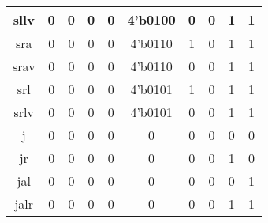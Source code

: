 \documentclass[UTF8]{ctexart}
\begin{document}
\begin{table}[H]
\begin{threeparttable}
\begin{tabular}{|c|c|c|c|c|c|c|c|c|c|}
			\hline
			sllv                                     & 0                 & 0                 & 0               & 0                 & 4'b0100          & 0                & 0               & 1               & 1                 \\
			\hline
			sra                                      & 0                 & 0                 & 0               & 0                 & 4'b0110          & 1                & 0               & 1               & 1                 \\
			\hline
			srav                                     & 0                 & 0                 & 0               & 0                 & 4'b0110          & 0                & 0               & 1               & 1                 \\
			\hline
			srl                                      & 0                 & 0                 & 0               & 0                 & 4'b0101          & 1                & 0               & 1               & 1                 \\
			\hline
			srlv                                     & 0                 & 0                 & 0               & 0                 & 4'b0101          & 0                & 0               & 1               & 1                 \\
			\hline
			j                                        & 0                 & 0                 & 0               & 0                 & 0                & 0                & 0               & 0               & 0                 \\
			\hline
			jr                                       & 0                 & 0                 & 0               & 0                 & 0                & 0                & 0               & 1               & 0                 \\
			\hline
			jal                                      & 0                 & 0                 & 0               & 0                 & 0                & 0                & 0               & 0               & 1                 \\
			\hline
			jalr                                     & 0                 & 0                 & 0               & 0                 & 0                & 0                & 0               & 1               & 1                 \\
			\hline
		\end{tabular}
	\end{threeparttable}
\end{table}
\end{document}
